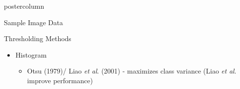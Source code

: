 \documentclass[final]{beamer}
\begin{document}
\begin{frame}
\begin{columns}
\begin{column}{.33\textwidth}
\begin{beamercolorbox}[center,wd=\textwidth]{postercolumn}
\begin{minipage}[T]{.95\textwidth}
{\begin{block}{Sample Image Data}
\begin{figure}
                 \quad
              \end{figure}
            \end{block}
            \vfill
            \begin{block}{Thresholding Methods}
              \begin{itemize}
              	\item Histogram
			\begin{itemize}
				\item Otsu (1979)/ Liao \emph{et al}. (2001) - maximizes class variance (Liao \emph{et al}. improve performance)

\end{itemize}
\end{itemize}
\end{block}}
\end{minipage}
\end{beamercolorbox}
\end{column}
\end{columns}
\end{frame}
\end{document}
